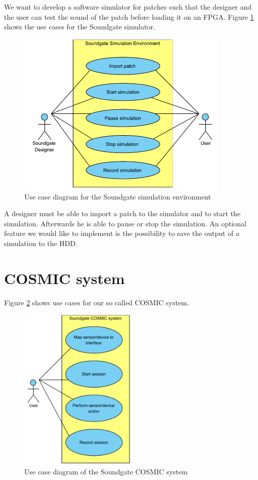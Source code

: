 We want to develop a software simulator for patches such that the designer and the user can test the sound of the patch before loading it on an \ac{FPGA}. Figure \ref{fig:Soundgate_Simulator} shows the use cases for the Soundgate simulator.

	\begin{figure}[!h]
		\centering
			\includegraphics[width=0.90\textwidth]{images/Soundgate_Simulator.pdf}
		\caption{Use case diagram for the Soundgate simulation environment}
		\label{fig:Soundgate_Simulator}
	\end{figure}

A designer must be able to import a patch to the simulator and to start the simulation. Afterwards he is able to pause or stop the simulation. An optional feature we would like to implement is the possibility to save the output of a simulation to the HDD.

\section{COSMIC system}
	Figure \ref{fig:Soundgate_UserInterface} shows use cases for our so called \ac{COSMIC} system. 
	
	\begin{figure}[!h]
		\centering
			\includegraphics[width=0.50\textwidth]{images/User_View.pdf}
		\caption{Use case diagram of the Soundgate COSMIC system}
		\label{fig:Soundgate_UserInterface}
	\end{figure}
	
